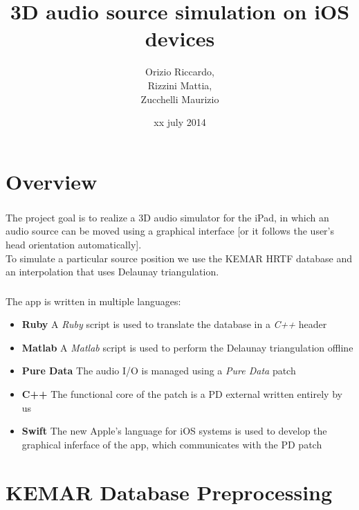 \documentclass{beamer}
\title{3D audio source simulation on iOS devices}
\author[Orizio, Rizzini, Zucchelli]{Orizio Riccardo,\\Rizzini Mattia,\\Zucchelli Maurizio}
\date{xx july 2014}
\institute[UniBS]{University of Brescia}
\begin{document}
	\begin{frame}
		\maketitle
	\end{frame}

	\section{Overview}
	
	\begin{frame}
	\frametitle{\insertsection}
	The project goal is to realize a 3D audio simulator for the iPad, in
	which an audio source can be moved using a graphical interface [or it follows
	the user's head orientation automatically].\\
	To simulate a particular source position we use the KEMAR HRTF database and an
	interpolation that uses Delaunay triangulation.\\
	\end{frame}

	\begin{frame}
	\frametitle{\insertsection}
	The app is written in multiple languages:
	\begin{itemize}
		\item {\bf Ruby} A {\em Ruby} script is used to translate the database in a {\em C++} header
		\item {\bf Matlab} A {\em Matlab} script is used to perform the Delaunay triangulation
			offline
		\item {\bf Pure Data} The audio I/O is managed using a {\em Pure Data} patch
		\item {\bf C++} The functional core of the patch is a PD external written entirely
			by us
		\item {\bf Swift} The new Apple's language for iOS systems is used to develop the
			graphical inferface of the app, which communicates with the PD patch
	\end{itemize}
	\end{frame}

	\AtBeginSection[]
	{
		\begin{frame}
			\frametitle{Outline}
			\tableofcontents[currentsection]
		\end{frame}
	}

	\section{KEMAR Database Preprocessing}
\end{document}
